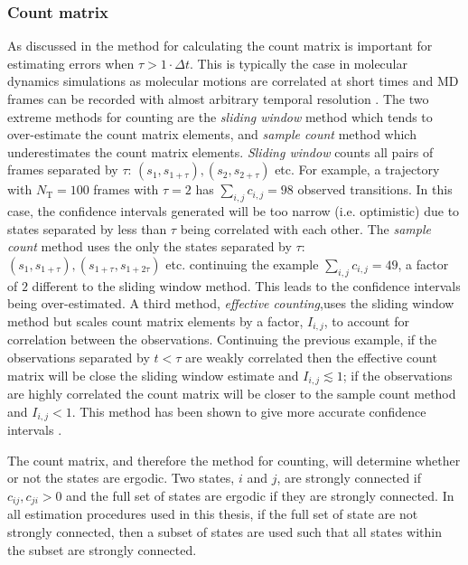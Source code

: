 \subsubsection{Count matrix}
As discussed in \cite{trendelkamp-schroerEstimationUncertaintyReversible2015b} the method for calculating the count matrix is important for estimating errors when  $\tau > 1\cdot \Delta t$. This is typically the case in molecular dynamics simulations as molecular motions are correlated at short times and MD frames can be recorded with almost arbitrary temporal resolution \cite{trendelkamp-schroerEstimationUncertaintyReversible2015b}.  The two extreme methods for counting are the \emph{sliding window} method which tends to over-estimate the count matrix elements,  and \emph{sample count} method which underestimates the count matrix elements. \cite{trendelkamp-schroerEstimationUncertaintyReversible2015b} \emph{Sliding window} counts all pairs of frames separated by $\tau$: $(s_1, s_{1+\tau}), (s_2, s_{2+\tau})$ etc. For example, a trajectory with $N_{\mathrm{T}}=100$ frames with $\tau=2$ has $\sum_{i,j}c_{i,j}=98$ observed transitions. In this case, the confidence intervals generated will be too narrow (i.e. optimistic) due to states separated by less than $\tau$ being correlated with each other. The \emph{sample count} method uses the only the states separated by $\tau$: $(s_1, s_{1+\tau}), (s_{1+\tau}, s_{1+2\tau})$ etc. continuing the example $\sum_{i,j}c_{i,j}=49$, a factor of $2$ different to the sliding window method. This leads to the confidence intervals being over-estimated. A third method, \emph{effective counting},uses the sliding window method but scales count matrix elements by a  factor, $I_{i,j}$, to account for correlation between the observations. \cite{noeStatisticalInefficiencyMarkov}\cite{trendelkamp-schroerEstimationUncertaintyReversible2015b} Continuing the previous example, if the observations separated by $t<\tau$ are weakly correlated then the effective count matrix will be close the sliding window estimate and $I_{i,j} \lesssim 1$; if the observations are highly correlated the count matrix will be closer to the sample count method and $I_{i, j}<1$. This method has been shown to give more accurate confidence intervals \cite{trendelkamp-schroerEstimationUncertaintyReversible2015b}. 

The count matrix, and therefore the method for counting,  will determine whether or not the states are ergodic. Two states, $i$ and $j$, are strongly connected if $c_{ij}, c_{ji}>0$ and the full set of states are ergodic if they are strongly connected.  \cite{wilson1996introduction} In all estimation procedures used in this thesis, if the full set of state are not strongly connected, then a subset of states are used such that all states within the subset are strongly connected.

